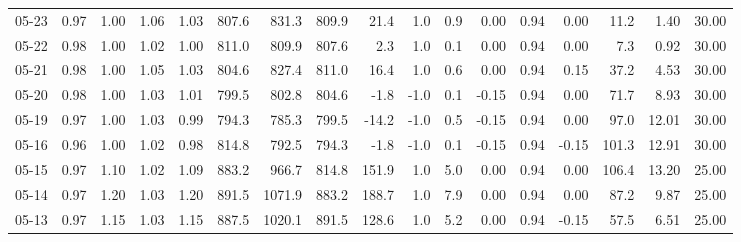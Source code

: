 \begin{threeparttable}
{\begin{tabular}{lrrrrrrrrrrrrrrrr}
  05-23 &         0.97 &           1.00 &          1.06 &          1.03 & 807.6 &  831.3 & 809.9 &       21.4 &                      1.0 &                 0.9 &       0.00 &      0.94 &           0.00 &             11.2 &            1.40 &                  30.00 \\
  05-22 &         0.98 &           1.00 &          1.02 &          1.00 & 811.0 &  809.9 & 807.6 &        2.3 &                      1.0 &                 0.1 &       0.00 &      0.94 &           0.00 &              7.3 &            0.92 &                  30.00 \\
  05-21 &         0.98 &           1.00 &          1.05 &          1.03 & 804.6 &  827.4 & 811.0 &       16.4 &                      1.0 &                 0.6 &       0.00 &      0.94 &           0.15 &             37.2 &            4.53 &                  30.00 \\
  05-20 &         0.98 &           1.00 &          1.03 &          1.01 & 799.5 &  802.8 & 804.6 &       -1.8 &                     -1.0 &                 0.1 &      -0.15 &      0.94 &           0.00 &             71.7 &            8.93 &                  30.00 \\
  05-19 &         0.97 &           1.00 &          1.03 &          0.99 & 794.3 &  785.3 & 799.5 &      -14.2 &                     -1.0 &                 0.5 &      -0.15 &      0.94 &           0.00 &             97.0 &           12.01 &                  30.00 \\
  05-16 &         0.96 &           1.00 &          1.02 &          0.98 & 814.8 &  792.5 & 794.3 &       -1.8 &                     -1.0 &                 0.1 &      -0.15 &      0.94 &          -0.15 &            101.3 &           12.91 &                  30.00 \\
  05-15 &         0.97 &           1.10 &          1.02 &          1.09 & 883.2 &  966.7 & 814.8 &      151.9 &                      1.0 &                 5.0 &       0.00 &      0.94 &           0.00 &            106.4 &           13.20 &                  25.00 \\
  05-14 &         0.97 &           1.20 &          1.03 &          1.20 & 891.5 & 1071.9 & 883.2 &      188.7 &                      1.0 &                 7.9 &       0.00 &      0.94 &           0.00 &             87.2 &            9.87 &                  25.00 \\
  05-13 &         0.97 &           1.15 &          1.03 &          1.15 & 887.5 & 1020.1 & 891.5 &      128.6 &                      1.0 &                 5.2 &       0.00 &      0.94 &          -0.15 &             57.5 &            6.51 &                  25.00 \\

\end{tabular}}
\end{threeparttable}
